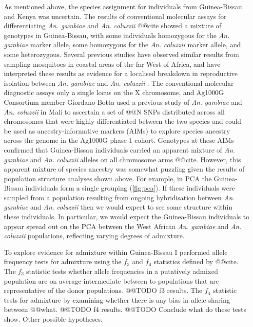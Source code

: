 \documentclass[a4paper,11pt,abstracton,hidelinks]{scrartcl}
\begin{document}
As mentioned above, the species assignment for individuals from Guinea-Bissau and Kenya was uncertain.
%
The results of conventional molecular assays for differentiating \textit{An. gambiae} and \textit{An. coluzzii} @@cite showed a mixture of genotypes in Guinea-Bissau, with some individuals homozygous for the \textit{An. gambiae} marker allele, some homozygous for the \textit{An. coluzzii} marker allele, and some heterozygous.
%
Several previous studies have observed similar results from sampling mosquitoes in coastal areas of the far West of Africa, and have interpreted these results as evidence for a localised breakdown in reproductive isolation between \textit{An. gambiae} and \textit{An. coluzzii} \parencite{Oliveira2008,Marsden2011,Weetman2012,Gordicho2014,Vicente2017}.
%
The conventional molecular diagnostic assays only a single locus on the X chromosome, and Ag1000G Consortium member Giordano Botta used a previous study of \textit{An. gambiae} and \textit{An. coluzzii} in Mali to ascertain a set of @@N SNPs distributed across all chromosomes that were highly differentiated between the two species and could be used as ancestry-informative markers (AIMs) to explore species ancestry across the genome in the Ag1000G phase 1 cohort.
%
Genotypes at these AIMs confirmed that Guinea-Bissau individuals carried an apparent mixture of \textit{An. gambiae} and \textit{An. coluzzii} alleles on all chromosome arms @@cite.
%
However, this apparent mixture of species ancestry was somewhat puzzling given the results of population structure analyses shown above.
%
For example, in PCA the Guinea-Bissau individuals form a single grouping (\ref{fig:pca}).
%
If these individuals were sampled from a population resulting from ongoing hybridisation between \textit{An. gambiae} and \textit{An. coluzzii} then we would expect to see some structure within these individuals.
%
In particular, we would expect the Guinea-Bissau individuals to appear spread out on the PCA between the West African \textit{An. gambiae} and \textit{An. coluzzii} populations, reflecting varying degrees of admixture.

%
To explore evidence for admixture within Guinea-Bissau I performed allele frequency tests for admixture using the $f_{3}$ and $f_{4}$ statistics defined by @@cite.
%
The $f_{3}$ statistic tests whether allele frequencies in a putatively admixed population are on average intermediate between to populations that are representative of the donor populations.
%
@@TODO f3 results.
%
The $f_{4}$ statistic tests for admixture by examining whether there is any bias in allele sharing between @@what.
%
@@TODO f4 results.
%
@@TODO Conclude what do these tests show. Other possible hypotheses.
\end{document}
